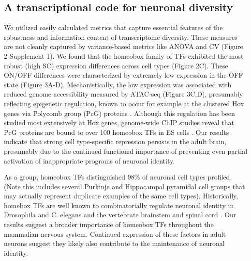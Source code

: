 \subsection{A transcriptional code for neuronal diversity}
We utilized easily calculated metrics that capture essential features of the robustness and information content of transcriptome diversity. These measures are not cleanly captured by variance-based metrics like ANOVA and CV (Figure 2 Supplement 1). We found that the homeobox family of TFs exhibited the most robust (high SC) expression differences across cell types (Figure 2C). These ON/OFF differences were characterized by extremely low expression in the OFF state (Figure 3A-D). Mechanistically, the low expression was associated with reduced genome accessibility measured by ATAC-seq (Figure 3C,D), presumably reflecting epigenetic regulation, known to occur for example at the clustered Hox genes via Polycomb group (PcG) proteins \citep{Montavon_2014}. Although this regulation has been studied most extensively at Hox genes, genome-wide ChIP studies reveal that PcG proteins are bound to over 100 homeobox TFs in ES cells \citep{Boyer_2006}. Our results indicate that strong cell type-specific repression persists in the adult brain, presumably due to the continued functional importance of preventing even partial activation of inappropriate programs of neuronal identity. 

As a group, homeobox TFs distinguished 98\% of neuronal cell types profiled. (Note this includes several Purkinje and Hippocampal pyramidal cell groups that may actually represent duplicate examples of the same cell types). Historically, homebox TFs are well known to combinatorially regulate neuronal identity in Drosophila and C. elegans \citep{Kratsios_2017} and the vertebrate brainstem and spinal cord \citep{Dasen_2009,Philippidou_2013}.
Our results suggest a broader importance of homeobox TFs throughout the mammalian nervous system. Continued expression of these factors in adult neurons suggest they likely also contribute to the maintenance of neuronal identity.


